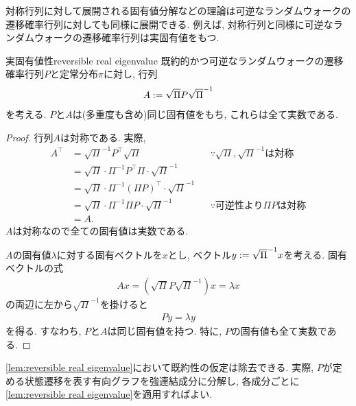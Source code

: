 対称行列に対して展開される固有値分解などの理論は可逆なランダムウォークの遷移確率行列に対しても同様に展開できる.
例えば, 対称行列と同様に可逆なランダムウォークの遷移確率行列は実固有値をもつ.
\begin{lemma}{実固有値性}{reversible real eigenvalue}
    既約的かつ可逆なランダムウォークの遷移確率行列$P$と定常分布$\pi$に対し,
    行列
    \begin{align}
        A \mathrel{:=} \sqrt{\Pi} P \sqrt{\Pi}^{-1} \label{eq: symmetrized P}
    \end{align}
    を考える.
    $P$と$A$は(多重度も含め)同じ固有値をもち, これらは全て実数である.
\end{lemma}
\begin{proof}
    行列$A$は対称である.
    実際,
    \begin{align*}
        A^\top &= \sqrt{\Pi}^{-1} P^{\top} \sqrt{\Pi} & & \text{$\because$$\sqrt{\Pi},\sqrt{\Pi}^{-1}$は対称}\\
        &= \sqrt{\Pi} \cdot \Pi^{-1} P^{\top} \Pi \cdot \sqrt{\Pi}^{-1} \\
        &= \sqrt{\Pi} \cdot \Pi^{-1} (\Pi P)^{\top} \cdot \sqrt{\Pi}^{-1} \\
        &= \sqrt{\Pi} \cdot \Pi^{-1} \Pi P \cdot \sqrt{\Pi}^{-1} & & \text{$\because$可逆性より$\Pi P$は対称} \\
        &= A.
    \end{align*}
    $A$は対称なので全ての固有値は実数である.

    $A$の固有値$\lambda$に対する固有ベクトルを$x$とし, ベクトル$y\mathrel{:=} \sqrt{\Pi}^{-1}x$を考える.
    固有ベクトルの式
    \begin{align*}
        A x = (\sqrt{\Pi} P \sqrt{\Pi}^{-1})x =  \lambda x
    \end{align*}
    の両辺に左から$\sqrt{\Pi}^{-1}$を掛けると
    \begin{align*}
        P y = \lambda y
    \end{align*}
    を得る.
    すなわち, $P$と$A$は同じ固有値を持つ.
    特に, $P$の固有値も全て実数である.
\end{proof}
\cref{lem:reversible real eigenvalue}において既約性の仮定は除去できる.
実際, $P$が定める状態遷移を表す有向グラフを強連結成分に分解し,
各成分ごとに\cref{lem:reversible real eigenvalue}を適用すればよい.

